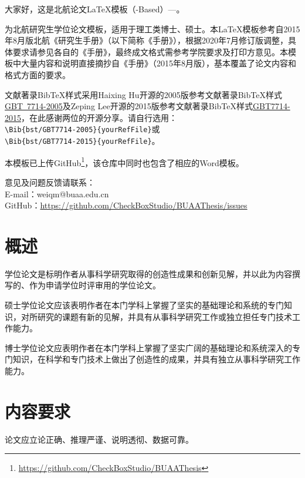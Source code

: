 \appendix

大家好，这是北航论文\LaTeX{}模板（\CTeX{}-Based）---\BUAAThesis{}。

\BUAAThesis{}为北航研究生学位论文模板，适用于理工类博士、硕士。本\LaTeX{}模板参考自2015年8月版北航《研究生手册》（以下简称《手册》），根据2020年7月修订版调整，具体要求请参见各自的《手册》，最终成文格式需参考学院要求及打印方意见。本模板中大量内容和说明直接摘抄自《手册》（2015年8月版），基本覆盖了论文内容和格式方面的要求。

文献著录BibTeX样式采用Haixing Hu开源的2005版参考文献著录BibTeX样式\href{https://github.com/Haixing-Hu/GBT7714-2005-BibTeX-Style}{GBT~7714-2005}及Zeping Lee开源的2015版参考文献著录BibTeX样式\href{https://github.com/zepinglee/gbt7714-bibtex-style}{GBT7714-2015}，在此感谢两位的开源分享。请自行选用：\\
\verb|\Bib{bst/GBT7714-2005}{yourRefFile}|或\\
\verb|\Bib{bst/GBT7714-2015}{yourRefFile}|。


本模板已上传GitHub\footnote{\href{https://github.com/CheckBoxStudio/BUAAThesis}{https://github.com/CheckBoxStudio/BUAAThesis}}，该仓库中同时也包含了相应的Word模板。

意见及问题反馈请联系：\\
\indent E-mail：weiqm@buaa.edu.cn\\
\indent GitHub：\href{https://github.com/CheckBoxStudio/BUAAThesis/issues}{https://github.com/CheckBoxStudio/BUAAThesis/issues}

\section{概述}
学位论文是标明作者从事科学研究取得的创造性成果和创新见解，并以此为内容撰写的、作为申请学位时评审用的学位论文。

硕士学位论文应该表明作者在本门学科上掌握了坚实的基础理论和系统的专门知识，对所研究的课题有新的见解，并具有从事科学研究工作或独立担任专门技术工作能力。

博士学位论文应表明作者在本门学科上掌握了坚实广阔的基础理论和系统深入的专门知识，在科学和专门技术上做出了创造性的成果，并具有独立从事科学研究工作能力。

\section{内容要求}
论文应立论正确、推理严谨、说明透彻、数据可靠。


